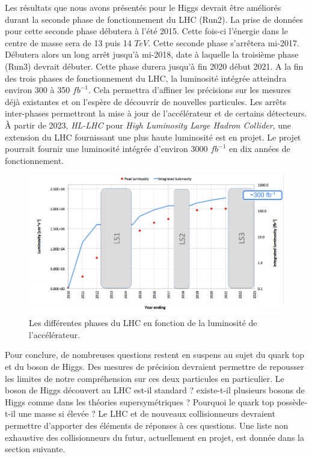   \medskip
  
  Les r\'esultats que nous avons pr\'esent\'es pour le Higgs devrait \^etre am\'elior\'es durant la seconde phase de fonctionnement du LHC (Run2). La prise de donn\'ees pour cette seconde phase d\'ebutera \`a l'\'et\'e 2015. Cette fois-ci l'\'energie dans le centre de masse sera de 13 puis 14 $TeV$. Cette seconde phase s'arrêtera mi-2017. D\'ebutera alors un long arrêt jusqu'\`a mi-2018, date \`a laquelle la troisième phase (Run3) devrait d\'ebuter. Cette phase durera jusqu'à fin 2020 d\'ebut 2021. A la fin des trois phases de fonctionnement du LHC, la luminosit\'e int\'egr\'ee atteindra environ 300 \`a 350 $fb^{-1}$. Cela permettra d'affiner les pr\'ecisions sur les mesures d\'ejà existantes et on l'esp\`ere de d\'ecouvrir de nouvelles particules. Les arr\^ets inter-phases permettront la mise \`a jour de l'acc\'el\'erateur et de certains d\'etecteurs. \`A partir de 2023, \textit{HL-LHC} pour \textit{High Luminosity Large Hadron Collider}, une extension du LHC fournissant une plus haute luminosit\'e est en projet. Le projet pourrait fournir une luminosit\'e int\'egr\'ee d'environ 3000 $fb^{-1}$ en dix ann\'ees de fonctionnement.
  
  \begin{figure}[!htb]
    \begin{center} 
      \includegraphics[scale=0.30]{./figures/program_LHC.png}
      \caption{Les diff\'erentes phases du LHC en fonction de la luminosit\'e de l'acc\'el\'erateur.}
     \label{fig:program_LHC}
     \end{center}
  \end{figure}
  
  \medskip
  
  Pour conclure, de nombreuses questions restent en suspens au sujet du quark top et du boson de Higgs. Des mesures de pr\'ecision devraient permettre de repousser les limites de notre compréhension sur ces deux particules en particulier. Le boson de Higgs d\'ecouvert au LHC est-il standard ? existe-t-il plusieurs bosons de Higgs comme dans les th\'eories supersym\'etriques ? Pourquoi le quark top poss\`ede-t-il une masse si \'elev\'ee ? Le LHC et de nouveaux collisionneurs devraient permettre d'apporter des \'el\'ements de r\'eponses \`a ces questions. Une liste non exhaustive des collisionneurs du futur, actuellement en projet, est donn\'ee dans la section suivante.
  
